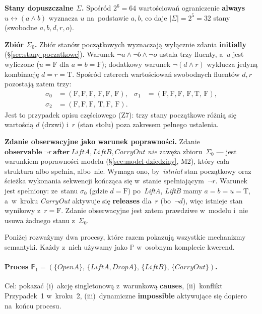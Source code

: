 \documentclass[11pt,a4paper]{article}
\newcommand{\causes}{\textbf{causes}}
\newcommand{\aft}{\textbf{after}}
\newcommand{\initially}{\textbf{initially}}
\newcommand{\always}{\textbf{always}}
\newcommand{\impossible}{\textbf{impossible}}
\newcommand{\releases}{\textbf{releases}}
\newcommand{\observable}{\textbf{observable}}
\theoremstyle{definition}
\begin{document}
\medskip
\noindent\textbf{Stany dopuszczalne $\Sigma$.}
Spośród $2^6 = 64$ wartościowań ograniczenie \always{} $u \leftrightarrow (a \land b)$
wyznacza $u$ na~podstawie $a, b$, co daje $|\Sigma| = 2^5 = 32$ stany
(swobodne $a, b, d, r, o$).

\medskip
\noindent\textbf{Zbiór $\Sigma_0$.}
Zbiór stanów początkowych wyznaczają wyłącznie zdania \initially{}
(\S\ref{sec:stany-poczatkowe}). Warunek $\neg a \land \neg b \land \neg o$
ustala trzy fluenty, a~$u$ jest wyliczone ($u = \text{F}$ dla $a = b = \text{F}$);
dodatkowy warunek $\neg(d \land r)$ wyklucza jedyną kombinację $d = r = \text{T}$.
Spośród czterech wartościowań swobodnych fluentów $d, r$ pozostają zatem trzy:
\begin{align*}
  \sigma_0 &= (\text{F},\text{F},\text{F},\,\text{F},\text{F},\,\text{F}), &
  \sigma_1 &= (\text{F},\text{F},\text{F},\,\text{F},\text{T},\,\text{F}), \\
  \sigma_2 &= (\text{F},\text{F},\text{F},\,\text{T},\text{F},\,\text{F}).
\end{align*}
Jest to przypadek opisu częściowego (Z7): trzy stany początkowe różnią się
wartością $d$ (drzwi) i~$r$ (stan stołu) poza zakresem pełnego ustalenia.

\medskip
\noindent\textbf{Zdanie obserwacyjne jako warunek poprawności.}
Zdanie $\observable\ \neg r\ \aft\ \mathit{LiftA}, \mathit{LiftB}, \mathit{CarryOut}$
\emph{nie} zawęża zbioru~$\Sigma_0$ --- jest warunkiem poprawności modelu
(\S\ref{sec:model-dziedziny}, M2), który cała struktura albo spełnia, albo~nie.
Wymaga ono, by~\emph{istniał} stan początkowy oraz ścieżka wykonania sekwencji
kończąca się w~stanie spełniającym~$\neg r$. Warunek jest spełniony: ze~stanu
$\sigma_0$ (gdzie $d = \text{F}$) po~\textit{LiftA}, \textit{LiftB} mamy
$a = b = u = \text{T}$, a~w~kroku \textit{CarryOut} aktywuje się \releases{}
dla~$r$ (bo~$\neg d$), więc istnieje stan wynikowy z~$r = \text{F}$. Zdanie
obserwacyjne jest zatem prawdziwe w~modelu i~nie usuwa żadnego stanu z~$\Sigma_0$.

\medskip
\noindent Poniżej rozważymy dwa procesy, które razem pokazują wszystkie
mechanizmy semantyki. Każdy z~nich używamy jako $\mathbb{P}$ w~osobnym
komplecie kwerend.

\paragraph{Proces $\mathbb{P}_1 = (\{\mathit{OpenA}\},\, \{\mathit{LiftA}, \mathit{DropA}\},\,
\{\mathit{LiftB}\},\, \{\mathit{CarryOut}\})$.}
Cel: pokazać (i)~akcję singletonową z~warunkową \causes{},
(ii)~konflikt Przypadek~1 w~kroku~2,
(iii)~dynamiczne \impossible{} aktywujące się dopiero na~końcu procesu.
\end{document}
